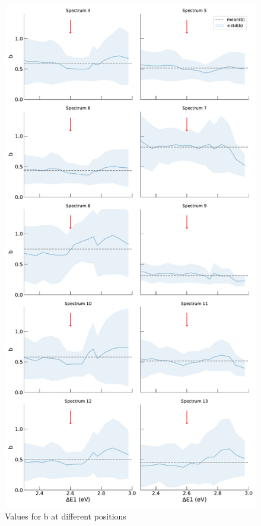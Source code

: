 \begin{figure}[ht]
\begin{centering}
\includegraphics[width=0.6\linewidth]{plots/bvalues.pdf} 
\caption{Values for b at different positions}
\label{fig:bvalues}
\end{centering}
\end{figure}

